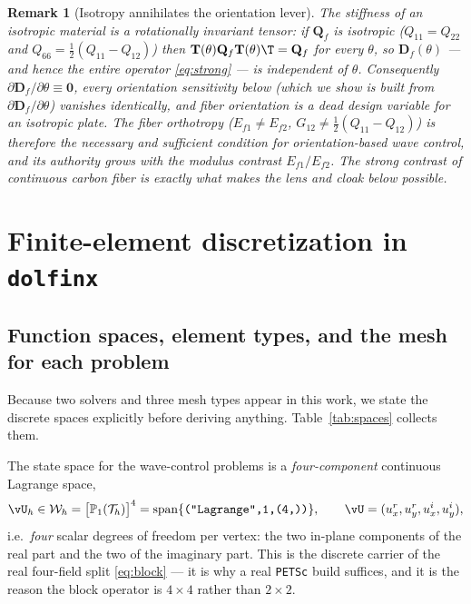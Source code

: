 \documentclass[11pt]{article}
\newtheorem{remark}{Remark}
\begin{document}
\begin{remark}[Isotropy annihilates the orientation lever]
\label{rem:iso}
The stiffness of an \emph{isotropic} material is a rotationally invariant tensor:
if $\mathbf Q_f$ is isotropic ($Q_{11}=Q_{22}$ and $Q_{66}=\tfrac12(Q_{11}-Q_{12})$)
then $\mathbf T(\theta)\mathbf Q_f\mathbf T(\theta)\T=\mathbf Q_f$ for every
$\theta$, so $\mathbf D_f(\theta)$ --- and hence the entire operator
\eqref{eq:strong} --- is \emph{independent of $\theta$}. Consequently
$\partial\mathbf D_f/\partial\theta\equiv\mathbf 0$, every orientation
sensitivity below (which we show is built from $\partial\mathbf D_f/\partial
\theta$) vanishes identically, and fiber orientation is a \emph{dead design
variable} for an isotropic plate. The fiber orthotropy ($E_{f1}\neq E_{f2}$,
$G_{12}\neq\tfrac12(Q_{11}-Q_{12})$) is therefore the necessary and sufficient
condition for orientation-based wave control, and its authority grows with the
modulus contrast $E_{f1}/E_{f2}$. The strong contrast of continuous carbon fiber
is exactly what makes the lens and cloak below possible.
\end{remark}

\section{Finite-element discretization in \texttt{dolfinx}}
\label{sec:fem}

\subsection{Function spaces, element types, and the mesh for each problem}
\label{sec:spaces}
Because two solvers and three mesh types appear in this work, we state the
discrete spaces explicitly before deriving anything. Table~\ref{tab:spaces}
collects them.

The state space for the wave-control problems is a \emph{four-component}
continuous Lagrange space,
\begin{equation}
  \vU_h\in\mathcal W_h=\bigl[\mathbb P_1(\mathcal T_h)\bigr]^4
  =\operatorname{span}\{\text{\texttt{("Lagrange",1,(4,))}}\},
  \qquad
  \vU=(u_x^r,u_y^r,u_x^i,u_y^i),
  \label{eq:Wspace}
\end{equation}
i.e.\ \emph{four} scalar degrees of freedom per vertex: the two in-plane
components of the real part and the two of the imaginary part. This is the
discrete carrier of the real four-field split \eqref{eq:block} --- it is why a
real \texttt{PETSc} build suffices, and it is the reason the block operator is
$4\times4$ rather than $2\times2$.
\end{document}

